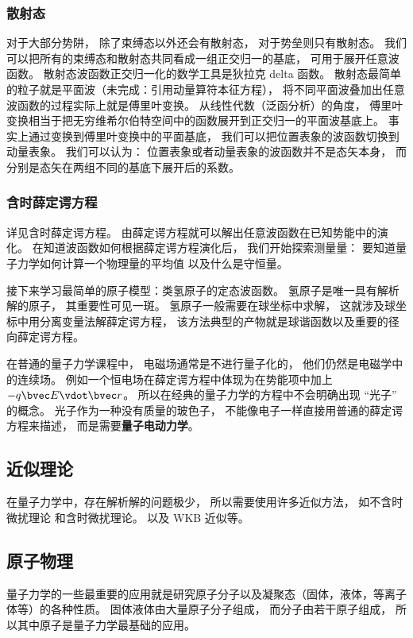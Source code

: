 \subsubsection{散射态}
对于大部分势阱， 除了束缚态以外还会有散射态， 对于势垒则只有散射态。 我们可以把所有的束缚态和散射态共同看成一组正交归一的基底， 可用于展开任意波函数。 散射态波函数正交归一化的数学工具是狄拉克 delta 函数。 散射态最简单的粒子就是平面波（未完成：引用动量算符本征方程）， 将不同平面波叠加出任意波函数的过程实际上就是傅里叶变换。 从线性代数（泛函分析）的角度， 傅里叶变换相当于把无穷维希尔伯特空间中的函数展开到正交归一的平面波基底上。 事实上通过变换到傅里叶变换中的平面基底， 我们可以把位置表象的波函数切换到动量表象。 我们可以认为： 位置表象或者动量表象的波函数并不是态矢本身， 而分别是态矢在两组不同的基底下展开后的系数。

\subsubsection{含时薛定谔方程}
详见含时薛定谔方程。 由薛定谔方程就可以解出任意波函数在已知势能中的演化。 在知道波函数如何根据薛定谔方程演化后， 我们开始探索测量量： 要知道量子力学如何计算一个物理量的平均值 以及什么是守恒量。

接下来学习最简单的原子模型：类氢原子的定态波函数。 氢原子是唯一具有解析解的原子， 其重要性可见一斑。 氢原子一般需要在球坐标中求解， 这就涉及球坐标中用分离变量法解薛定谔方程， 该方法典型的产物就是球谐函数以及重要的径向薛定谔方程。

在普通的量子力学课程中， 电磁场通常是不进行量子化的， 他们仍然是电磁学中的连续场。 例如一个恒电场在薛定谔方程中体现为在势能项中加上 $-q\bvec E \vdot \bvec r$。 所以在经典的量子力学的方程中不会明确出现 “光子” 的概念。 光子作为一种没有质量的玻色子， 不能像电子一样直接用普通的薛定谔方程来描述， 而是需要\textbf{量子电动力学}。

\subsection{近似理论}
在量子力学中，存在解析解的问题极少， 所以需要使用许多近似方法， 如不含时微扰理论 和含时微扰理论。 以及 WKB 近似等。

\subsection{原子物理}
量子力学的一些最重要的应用就是研究原子分子以及凝聚态（固体，液体，等离子体等）的各种性质。 固体液体由大量原子分子组成， 而分子由若干原子组成， 所以其中原子是量子力学最基础的应用。


